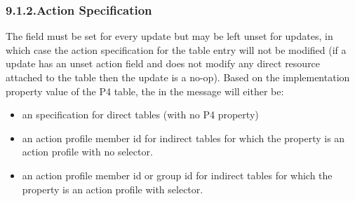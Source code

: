 \documentclass[11pt]{article}
\begin{document}
{%
\subsubsection{9.1.2.\hspace*{0.5em}Action Specification}\label{sec-action-specification}%

\noindent{}The   field must be set for every  update but may be
left unset for  updates, in which case the action specification for the
table entry will not be modified (if a  update has an unset action field
and does not modify any direct resource attached to the table then the 
update is a no-op). Based on the implementation property value of the P4 table,
the  in the  message will either be:%

\begin{itemize}%

\item{}
an  specification for direct tables (with no P4 
property)%

\item{}
an action profile member id for indirect tables for which the 
property is an action profile with no selector.%

\item{}
an action profile member id or group id for indirect tables for which the
 property is an action profile with selector.%


\end{itemize}}
\end{document}
